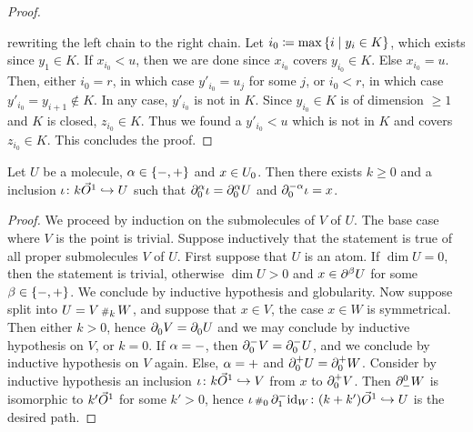 \begin{proof}
\begin{center}
    \end{center}
    rewriting the left chain to the right chain.
    Let \( i_0 \eqdef \max \set{i \mid y_i \in K} \), which exists since \( y_1 \in K \).
    If \( x_{i_0} < u \), then we are done since \( x_{i_0} \) covers \( y_{i_0} \in K \).
    Else \( x_{i_0} = u \).
    Then, either \( i_0 = r \), in which case \( y'_{i_0} = u_j \) for some \( j \), or \( i_0 < r \), in which case \( y'_{i_0} = y_{i + 1} \notin K \).
    In any case, \( y'_{i_0} \) is not in \( K \).
    Since \( y_{i_0} \in K \) is of dimension \( \geq 1 \) and \( K \) is closed, \( z_{i_0} \in K \).
    Thus we found a \( y'_{i_0} < u \) which is not in \( K \) and covers \( z_{i_0} \in K \).
    This concludes the proof.
\end{proof}


\begin{lem} \label{lem:path_from_zero_bd_to_all_points}
    Let \( U \) be a molecule, \( \a \in \set{-, +} \) and \( x \in \gr{0}{U} \).
    Then there exists \( k \geq 0 \) and a inclusion \( \iota \colon k\dglobe{1} \incl U \) such that \( \bd{0}{\a} \iota = \bd{0}{\a} U \) and \( \bd{0}{-\a} \iota = x \).
\end{lem}
\begin{proof}
    We proceed by induction on the submolecules of \( V \) of \( U \).
    The base case where \( V \) is the point is trivial.
    Suppose inductively that the statement is true of all proper submolecules \( V \) of \( U \).
    First suppose that \( U \) is an atom.
    If \( \dim U = 0 \), then the statement is trivial, otherwise \( \dim U > 0 \) and \( x \in \bd{}{\beta} U \) for some \( \beta \in \set{-, +} \).
    We conclude by inductive hypothesis and globularity.
    Now suppose split into \( U = V \cp{k} W \), and suppose that \( x \in V \), the case \( x \in W \) is symmetrical.
    Then either \( k > 0 \), hence \( \bd{0}{} V = \bd{0}{} U \) and we may conclude by inductive hypothesis on \( V \), or \( k = 0 \).
    If \( \a = - \), then \( \bd{0}{-} V = \bd{0}{-} U \), and we conclude by inductive hypothesis on \( V \) again.
    Else, \( \a = + \) and \( \bd{0}{+} U = \bd{0}{+} W \).
    Consider by inductive hypothesis an inclusion \( \iota \colon k\dglobe{1} \incl V \) from \( x \) to \( \bd{0}{+} V \).
    Then \( \bd{-}{0} W \) is isomorphic to \( k'\dglobe{1} \) for some \( k' > 0 \), hence \( \iota \cp{0} \bd{1}{-} \idd{W} \colon (k + k') \dglobe{1} \incl U \) is the desired path.
\end{proof}

